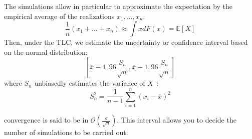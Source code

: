 %
%	
%	
%	
%	
%	
%	
%	
%	
%	

\begin{f}[Simulations]
	
	The simulations allow in particular to approximate the expectation by the empirical average of the realizations $x_1,\ldots,x_n$:
	$$
	\frac{1}{n}(x_1+\ldots+x_n)\approx \int xdF(x)=\mathbb{E}[X]
	$$
	Then, under the TLC, we estimate the uncertainty or confidence interval based on the normal distribution:
	$$
	\left[\overline{x}-1,96\frac{S_n}{\sqrt{n}},\overline{x}+1,96\frac{S_n}{\sqrt{n}}\right]
	$$
	where $S_n$ unbiasedly estimates the variance of $X$~:
	$$
	S_n^2=\frac{1}{n-1}\sum_{i=1}^{n}(x_i-\overline{x})^2
	$$
	
	convergence is said to be in $\mathcal{O}(\frac{\sigma}{\sqrt{n}})$.
	This interval allows you to decide the number of simulations to be carried out.
\end{f}

